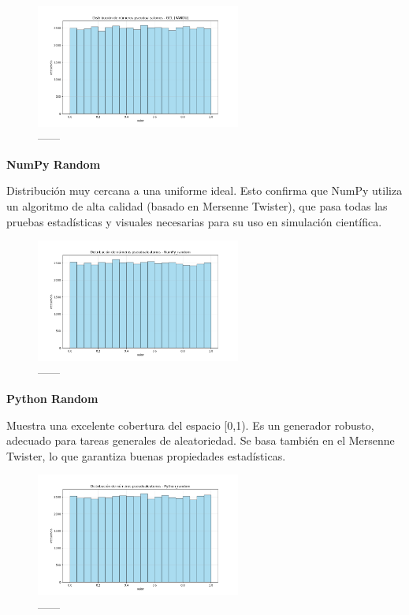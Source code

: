 \documentclass{article}
\begin{document}
\begin{figure}[H]
\centering
\includegraphics[width=0.6\textwidth]{Imagenes/distribucion_GCL (RANDU).png}
\caption{------}
\end{figure}

\textbf{NumPy Random}

Distribución muy cercana a una uniforme ideal. Esto confirma que NumPy utiliza un algoritmo de alta calidad (basado en Mersenne Twister), que pasa todas las pruebas estadísticas y visuales necesarias para su uso en simulación científica.

\begin{figure}[H]
\centering
\includegraphics[width=0.6\textwidth]{Imagenes/distribucion_NumPy_random.png}
\caption{------}
\end{figure}

\textbf{Python Random}

Muestra una excelente cobertura del espacio [0,1). Es un generador robusto, adecuado para tareas generales de aleatoriedad. Se basa también en el Mersenne Twister, lo que garantiza buenas propiedades estadísticas.

\begin{figure}[H]
\centering
\includegraphics[width=0.6\textwidth]{Imagenes/distribucion_Python_random.png}
\caption{------}
\end{figure}
\end{document}
